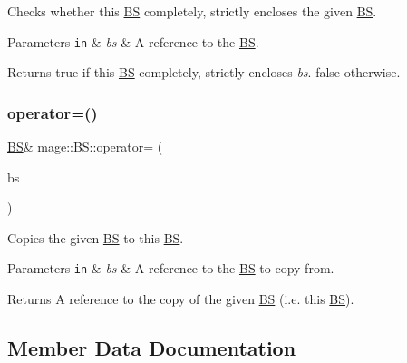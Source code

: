 Checks whether this \hyperlink{structmage_1_1_b_s}{BS} completely, strictly encloses the given \hyperlink{structmage_1_1_b_s}{BS}.


\begin{DoxyParams}[1]{Parameters}
\mbox{\tt in}  & {\em bs} & A reference to the \hyperlink{structmage_1_1_b_s}{BS}. \\
\hline
\end{DoxyParams}
\begin{DoxyReturn}{Returns}
{\ttfamily true} if this \hyperlink{structmage_1_1_b_s}{BS} completely, strictly encloses {\itshape bs}. {\ttfamily false} otherwise. 
\end{DoxyReturn}
\hypertarget{structmage_1_1_b_s_aef60d898cb44bbf1e3988351b5717faa}{}\label{structmage_1_1_b_s_aef60d898cb44bbf1e3988351b5717faa} 
\subsubsection{\texorpdfstring{operator=()}{operator=()}}
{\footnotesize\ttfamily \hyperlink{structmage_1_1_b_s}{BS}\& mage\+::\+B\+S\+::operator= (\begin{DoxyParamCaption}\item[{const \hyperlink{structmage_1_1_b_s}{BS} \&}]{bs }\end{DoxyParamCaption})\hspace{0.3cm}{\ttfamily [default]}}

Copies the given \hyperlink{structmage_1_1_b_s}{BS} to this \hyperlink{structmage_1_1_b_s}{BS}.


\begin{DoxyParams}[1]{Parameters}
\mbox{\tt in}  & {\em bs} & A reference to the \hyperlink{structmage_1_1_b_s}{BS} to copy from. \\
\hline
\end{DoxyParams}
\begin{DoxyReturn}{Returns}
A reference to the copy of the given \hyperlink{structmage_1_1_b_s}{BS} (i.\+e. this \hyperlink{structmage_1_1_b_s}{BS}). 
\end{DoxyReturn}


\subsection{Member Data Documentation}
\hypertarget{structmage_1_1_b_s_a9c6ad8f37fa6b98179e8108c8584fdcf}{}\label{structmage_1_1_b_s_a9c6ad8f37fa6b98179e8108c8584fdcf} 
